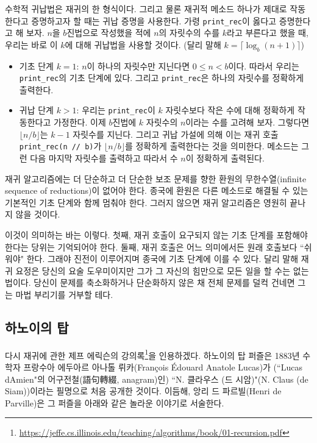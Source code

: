 \documentclass[a4paper]{oblivoir}
\begin{document}
수학적 귀납법은 재귀의 한 형식이다. 그리고 물론 재귀적 메소드 하나가 제대로 작동한다고 증명하고자 할 때는 귀납 증명을 사용한다. 가령 \texttt{print\_rec}이 옳다고 증명한다고 해 보자. $n$을 $b$진법으로 작성했을 적에 $n$의 자릿수의 수를 $k$라고 부른다고 했을 때, 우리는 바로 이 $k$에 대해 귀납법을 사용할 것이다. (달리 말해 $k=\lceil\log_b(n+1)\rceil$)

\begin{itemize}
    \item 기초 단계 $k=1$: $n$이 하나의 자릿수만 지닌다면 $0 \leq n < b$이다. 따라서 우리는 \texttt{print\_rec}의 기초 단계에 있다. 그리고 \texttt{print\_rec}은 하나의 자릿수를 정확하게 출력한다.
    \item 귀납 단계 $k>1$: 우리는 \texttt{print\_rec}이 $k$ 자릿수보다 작은 수에 대해 정확하게 작동한다고 가정한다. 이제 $b$진법에 $k$ 자릿수의 $n$이라는 수를 고려해 보자. 그렇다면 $\lfloor n/b \rfloor$는 $k-1$ 자릿수를 지닌다. 그리고 귀납 가설에 의해 이는 재귀 호출 \texttt{print\_rec(n // b)}가 $\lfloor n/b \rfloor$를 정확하게 출력한다는 것을 의미한다. 메소드는 그런 다음 마지막 자릿수를 출력하고 따라서 수 $n$이 정확하게 출력된다.
\end{itemize}

재귀 알고리즘에는 더 단순하고 더 단순한 보조 문제를 향한 환원의 무한수열(infinite sequence of reductions)이 없어야 한다. 종국에 환원은 다른 메소드로 해결될 수 있는 기본적인 기초 단계와 함께 멈춰야 한다. 그러지 않으면 재귀 알고리즘은 영원히 끝나지 않을 것이다.

이것이 의미하는 바는 이렇다. 첫째, 재귀 호출이 요구되지 않는 기초 단계를 포함해야 한다는 당위는 기억되어야 한다. 둘째, 재귀 호출은 어느 의미에서든 원래 호출보다 ``쉬워야" 한다. 그래야 진전이 이루어지며 종국에 기초 단계에 이를 수 있다. 달리 말해 재귀 요정은 당신의 요술 도우미이지만 그가 그 자신의 힘만으로 모든 일을 할 수는 없는 법이다. 당신이 문제를 축소화하거나 단순화하지 않은 채 전체 문제를 덜컥 건네면 그는 마법 부리기를 거부할 테다.

\subsection*{하노이의 탑}
다시 재귀에 관한 제프 에릭슨의 강의록\footnote{\url{https://jeffe.cs.illinois.edu/teaching/algorithms/book/01-recursion.pdf}}을 인용하겠다. 하노이의 탑 퍼즐은 1883년 수학자 프랑수아 에두아르 아나톨 뤼카(François Édouard Anatole Lucas)가 (``Lucas dAmien"의 어구전철(語句轉綴, anagram)인) ``N. 클라우스 (드 시암)"(N. Claus (de Siam))이라는 필명으로 처음 공개한 것이다. 이듬해, 앙리 드 파르빌(Henri de Parville)은 그 퍼즐을 아래와 같은 놀라운 이야기로 서술한다.
\end{document}
